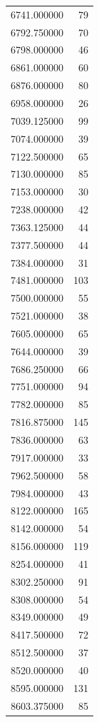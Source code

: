 \begin{tabular}{lr}
6741.000000   &    79 \\
6792.750000   &    70 \\
6798.000000   &    46 \\
6861.000000   &    60 \\
6876.000000   &    80 \\
6958.000000   &    26 \\
7039.125000   &    99 \\
7074.000000   &    39 \\
7122.500000   &    65 \\
7130.000000   &    85 \\
7153.000000   &    30 \\
7238.000000   &    42 \\
7363.125000   &    44 \\
7377.500000   &    44 \\
7384.000000   &    31 \\
7481.000000   &   103 \\
7500.000000   &    55 \\
7521.000000   &    38 \\
7605.000000   &    65 \\
7644.000000   &    39 \\
7686.250000   &    66 \\
7751.000000   &    94 \\
7782.000000   &    85 \\
7816.875000   &   145 \\
7836.000000   &    63 \\
7917.000000   &    33 \\
7962.500000   &    58 \\
7984.000000   &    43 \\
8122.000000   &   165 \\
8142.000000   &    54 \\
8156.000000   &   119 \\
8254.000000   &    41 \\
8302.250000   &    91 \\
8308.000000   &    54 \\
8349.000000   &    49 \\
8417.500000   &    72 \\
8512.500000   &    37 \\
8520.000000   &    40 \\
8595.000000   &   131 \\
8603.375000   &    85 \\

\end{tabular}
